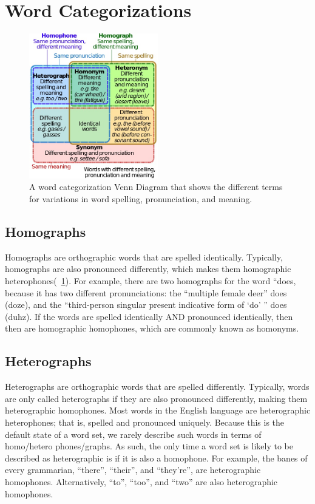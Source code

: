 \section{Word Categorizations}
\label{section:Word Categorizations}

\begin{figure}
\includegraphics[width=0.5\textwidth]{500px-Homograph_homophone_venn_diagram.jpg}
\captionfonts
\caption[Word Categorization Venn Diagram]{A word categorization Venn Diagram that shows the different terms for variations in word spelling, pronunciation, and meaning. }
\label{fig:vocab:wordCategorizationDiagram}
\end{figure}

\subsection{Homographs}
\label{section:Homographs}


Homographs are orthographic words that are spelled identically. Typically, homographs are also pronounced differently, which makes them homographic heterophones(~\ref{fig:vocab:wordCategorizationDiagram}). For example, there are two homographs for the word ``does, because it has two different pronunciations: the ``multiple female deer'' does (doze), and the ``third-person singular present indicative form of `do' '' does (duhz). If the words are spelled identically AND pronounced identically, then then are homographic homophones, which are commonly known as homonyms.


\subsection{Heterographs}
\label{section:Heterographs}

Heterographs are orthographic words that are spelled differently. Typically, words are only called heterographs if they are also pronounced differently, making them heterographic homophones. Most words in the English language are heterographic heterophones; that is, spelled and pronounced uniquely. Because this is the default state of a word set, we rarely describe such words in terms of homo\slash hetero phones\slash graphs.  As such, the only time a word set is likely to be described as heterographic is if it is also a homophone. For example, the banes of every grammarian, ``there'', ``their'', and ``they're'', are heterographic homophones. Alternatively, ``to'', ``too'', and ``two'' are also heterographic homophones.  

